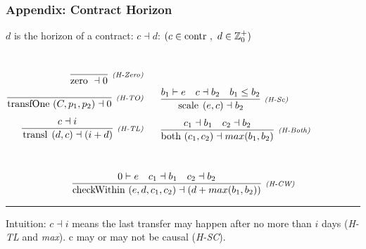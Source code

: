 \documentclass[xcolor=dvipsnames,11pt]{beamer}
\renewcommand{\emph}[1]{\textcolor{structure!90}{#1}}
\newcommand{\ttt}[1]{\mbox{\cd{#1}~}}
\newcommand{\zero}{\ttt{zero}}
\newcommand{\transfOne}{\ttt{transfOne}}
\newcommand{\scale}{\ttt{scale}}
\newcommand{\transl}{\ttt{transl}}
\newcommand{\both}{\ttt{both}}
\newcommand{\checkWithin}{\ttt{checkWithin}}
\begin{document}
\begin{frame}[fragile,t]
    \frametitle{Appendix: Contract Horizon}

\emph{$d$ is the horizon} of a contract: $ c \dashv d$:
{\scriptsize $ (c \in \ttt{contr},\ d \in \mathbb{Z}_0^+) $}

\begin{columns}
\begin{align*}
\crule{(H-Zero)}{}{\zero \dashv 0}&\\[1ex]
\crule{(H-TO)}{}{\transfOne(C,p_1,p_2)\dashv 0}&\\[1ex]
\crule{(H-TL)}{c \dashv i }{\transl(d,c) \dashv (i + d) }&\\[1ex]
\end{align*}

\begin{align*}
&\\[1ex]
&\crule{(H-Sc)}{b_1 \vdash e\ \ \ c \dashv b_2\ \ \ b_1 \leq b_2 }{\scale(e,c) \dashv b_2 }\\[1ex]
&\crule{(H-Both)}{c_1 \dashv b_1 \ \ \ c_2 \dashv b_2 }{\both(c_1,c_2) \dashv max(b_1,b_2) }\\[1ex]
\end{align*}
\end{columns}
$$ 
\crule{(H-CW)}{0\vdash e\ \ \ c_1 \dashv b_1 \ \ \ c_2 \dashv b_2 }{\checkWithin(e,d,c_1,c_2) \dashv (d + max(b_1,b_2)) }
$$

\medskip
\hrule
\medskip

\emph{Intuition:} $c \dashv i$ means the last transfer may happen after no more than $i$ days (\textit{H-TL} and \textit{max}). c may or may not be causal (\textit{H-SC}).

\end{frame}
\end{document}
